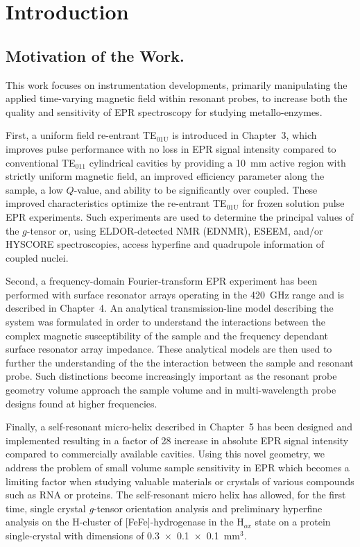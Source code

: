 \chapter[Introduction]{Introduction}



\section{Motivation of the Work.}
This work focuses on instrumentation developments, primarily manipulating the applied time-varying magnetic field within resonant probes, to increase both the quality and sensitivity of EPR spectroscopy for studying metallo-enzymes. 

First, a uniform field re-entrant TE$_{\text{01U}}$ is introduced in Chapter~3, which improves pulse performance with no loss in EPR signal intensity compared to conventional TE$_{011}$ cylindrical cavities by providing a 10~mm active region with strictly uniform magnetic field, an improved efficiency parameter along the sample, a low $Q$-value, and ability to be significantly over coupled. These improved characteristics optimize the re-entrant TE$_{\text{01U}}$ for frozen solution pulse EPR experiments. Such experiments are used to determine the principal values of the $g$-tensor or, using ELDOR-detected NMR (EDNMR), ESEEM, and/or HYSCORE spectroscopies, access hyperfine and quadrupole information of coupled nuclei. 

Second, a frequency-domain Fourier-transform EPR experiment has been performed with surface resonator arrays operating in the 420~GHz range and is described in Chapter~4. An analytical transmission-line model describing the system was formulated in order to understand the interactions between the complex magnetic susceptibility of the sample and the frequency dependant surface resonator array impedance. These analytical models are then used to further the understanding of the the interaction between the sample and resonant probe. Such distinctions become increasingly important as the resonant probe geometry volume approach the sample volume and in multi-wavelength probe designs found at higher frequencies. 

Finally, a self-resonant micro-helix  described in Chapter~5 has been designed and implemented resulting in a factor of 28 increase in absolute EPR signal intensity compared to commercially available cavities. Using this novel geometry, we address the problem of small volume sample sensitivity in EPR which becomes a limiting factor when studying valuable materials or crystals of various compounds such as RNA or proteins. The self-resonant micro helix has allowed, for the first time, single crystal \textit{g}-tensor orientation analysis and preliminary hyperfine analysis on the H-cluster of [FeFe]-hydrogenase in the H$_{ox}$ state on a protein single-crystal with dimensions of 0.3~$\times$~0.1~$\times$~0.1~mm$^3$. 

